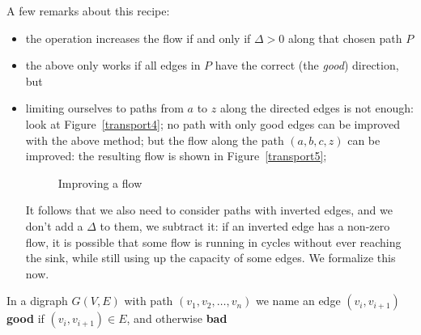 A few remarks about this recipe:
\begin{itemize}
\item the operation increases the flow if and only if $\Delta > 0$
along that chosen path $P$
\item the above only works if all edges in $P$ have the correct (the
{\em good}) direction, but
\item limiting ourselves to paths from $a$ to $z$ along the directed
edges is not enough: look at Figure~\ref{transport4}; no path with
only good edges can be improved with the above method; but the flow
along the path $(a,b,c,z)$ can be improved: the resulting flow is
shown in Figure~\ref{transport5};

\begin{figure}[ht]
\begin{center}
\hspace{1.2cm}
\end{center}
\caption{Improving a flow}
\end{figure}

It follows that we also need to consider paths with inverted edges,
and we don't add a $\Delta$ to them, we subtract it: if an inverted
edge has a non-zero flow, it is possible that some flow is running in
cycles without ever reaching the sink, while still using up the
capacity of some edges. We formalize this now.

\end{itemize}

 \begin{definition}
\textup{In a digraph $G(V,E)$ with path $(v_{1},v_{2},\ldots ,v_{n})$
we name an edge $(v_{i},v_{i+1})$ \textbf{good} if $(v_{i},v_{i+1})
\in E$, and otherwise \textbf{bad}}
\end{definition}

